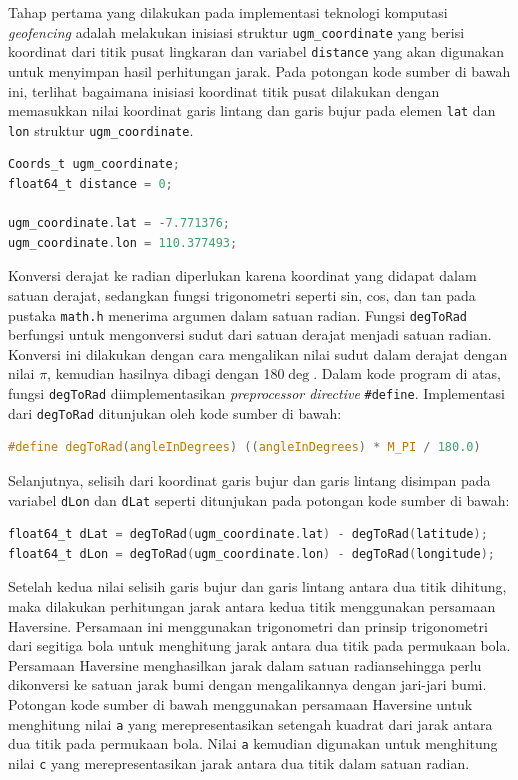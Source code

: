 Tahap pertama yang dilakukan pada implementasi teknologi komputasi \textit{geofencing} adalah melakukan inisiasi struktur \texttt{ugm\_coordinate} yang berisi koordinat dari titik pusat lingkaran dan variabel \texttt{distance} yang akan digunakan untuk menyimpan hasil perhitungan jarak. Pada potongan kode sumber di bawah ini, terlihat bagaimana inisiasi koordinat titik pusat dilakukan dengan memasukkan nilai koordinat garis lintang dan garis bujur pada elemen \texttt{lat} dan \texttt{lon} struktur \texttt{ugm\_coordinate}.

\begin{lstlisting}[language=c]
Coords_t ugm_coordinate;
float64_t distance = 0;

ugm_coordinate.lat = -7.771376;
ugm_coordinate.lon = 110.377493;
\end{lstlisting}

Konversi derajat ke radian diperlukan karena koordinat yang didapat dalam satuan derajat, sedangkan fungsi trigonometri seperti sin, cos, dan tan pada pustaka \texttt{math.h} menerima argumen dalam satuan radian. Fungsi  \texttt{degToRad} berfungsi untuk mengonversi sudut dari satuan derajat menjadi satuan radian. Konversi ini dilakukan dengan cara mengalikan nilai sudut dalam derajat dengan nilai $\pi$, kemudian hasilnya dibagi dengan 180$\deg$. Dalam kode program di atas, fungsi \texttt{degToRad} diimplementasikan \textit{preprocessor directive} \texttt{\#define}. Implementasi dari \texttt{degToRad} ditunjukan oleh kode sumber di bawah:

\begin{lstlisting}[language=c]
	#define degToRad(angleInDegrees) ((angleInDegrees) * M_PI / 180.0)
\end{lstlisting}

Selanjutnya, selisih dari koordinat garis bujur dan garis lintang disimpan pada variabel \texttt{dLon} dan \texttt{dLat} seperti ditunjukan pada potongan kode sumber di bawah:

\begin{lstlisting}[language=c]
float64_t dLat = degToRad(ugm_coordinate.lat) - degToRad(latitude);
float64_t dLon = degToRad(ugm_coordinate.lon) - degToRad(longitude);
\end{lstlisting}

Setelah kedua nilai selisih garis bujur dan garis lintang antara dua titik dihitung, maka dilakukan perhitungan jarak antara kedua titik menggunakan persamaan Haversine. Persamaan ini menggunakan trigonometri dan prinsip trigonometri dari segitiga bola untuk menghitung jarak antara dua titik pada permukaan bola. Persamaan Haversine menghasilkan jarak dalam satuan radiansehingga perlu dikonversi ke satuan jarak bumi dengan mengalikannya dengan jari-jari bumi. Potongan kode sumber di bawah menggunakan persamaan Haversine untuk menghitung nilai \texttt{a} yang merepresentasikan setengah kuadrat dari jarak antara dua titik pada permukaan bola. Nilai \texttt{a} kemudian digunakan untuk menghitung nilai \texttt{c} yang merepresentasikan jarak antara dua titik dalam satuan radian.


